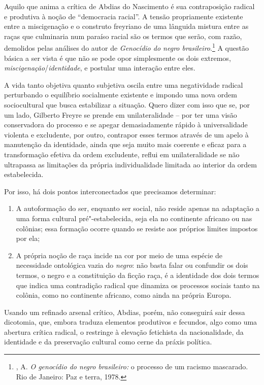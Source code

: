 Aquilo que anima a crítica de Abdias do Nascimento é sua contraposição
radical e produtiva à noção de ``democracia racial''. A tensão
propriamente existente entre a miscigenação e o construto freyriano de
uma lânguida mistura entre as raças que culminaria num paraíso racial
são os termos que serão, com razão, demolidos pelas análises do autor de
\emph{Genocídio do negro brasileiro}.\footnote{, A. \emph{O
  genocídio do negro brasileiro:} o processo de um racismo mascarado.
  Rio de Janeiro: Paz e terra, 1978.} A questão básica a ser vista é
que não se pode opor simplesmente os dois extremos,
\emph{miscigenação}/\emph{identidade}, e postular uma interação entre
eles.

A vida tanto objetiva quanto
subjetiva oscila entre uma negatividade radical perturbando o equilíbrio
socialmente existente e impondo uma nova ordem sociocultural que busca
estabilizar a situação. Quero dizer com isso que se, por um lado,
Gilberto Freyre se prende em unilateralidade -- por ter uma visão
conservadora do processo e se apegar demasiadamente rápido à
universalidade violenta e excludente, por outro, contrapor esses termos
através de um apelo à manutenção da identidade, ainda que seja muito
mais coerente e eficaz para a transformação efetiva da ordem excludente,
reflui em unilateralidade se não ultrapassa as limitações da própria
individualidade limitada ao interior da ordem estabelecida.

Por isso, há dois pontos interconectados que precisamos determinar: 

\begin{enumerate}
\item
A autoformação do ser, enquanto ser social, não reside apenas na adaptação
a uma forma cultural pré"-estabelecida, seja ela no continente africano
ou nas colônias; essa formação ocorre quando se resiste aos próprios
limites impostos por ela; 
\item
A própria noção de raça incide na cor por
meio de uma espécie de necessidade ontológica vazia do \emph{negro}: não
basta falar ou confundir os dois termos, o negro e a constituição da
ficção raça, é a identidade dos dois termos que indica uma contradição
radical que dinamiza os processos sociais tanto na colônia, como no
continente africano, como ainda na própria Europa.
\end{enumerate}

Usando um refinado arsenal crítico, Abdias, porém, não conseguirá sair
dessa dicotomia, que, embora traduza elementos produtivos e fecundos,
algo como uma abertura crítica radical, o restringe à elevação
fetichista da nacionalidade, da identidade e da preservação cultural
como cerne da práxis política.

